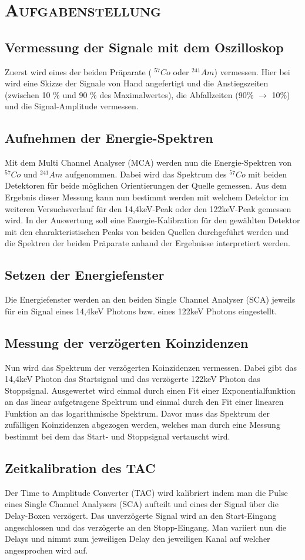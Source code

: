 \section{\textsc{Aufgabenstellung}}

\subsection*{Vermessung der Signale mit dem Oszilloskop}
Zuerst wird eines der beiden Präparate ( $^{57}Co$ oder $^{241}Am$) vermessen. Hier bei wird eine Skizze der Signale von Hand angefertigt und die Anstiegszeiten (zwischen 10 \% und 90 \% des Maximalwertes), die Abfallzeiten (90\% $\rightarrow$ 10\%) und die Signal-Amplitude vermessen.
\subsection*{Aufnehmen der Energie-Spektren}
Mit dem Multi Channel Analyser (MCA) werden nun die Energie-Spektren von $^{57}Co$ und $^{241}Am$ aufgenommen. Dabei wird das Spektrum des $^{57}Co$ mit beiden Detektoren für beide möglichen Orientierungen der Quelle gemessen. Aus dem Ergebnis dieser Messung kann nun bestimmt werden mit welchem Detektor im weiteren Versuchsverlauf für den 14,4keV-Peak oder den 122keV-Peak gemessen wird.
In der Auswertung soll eine Energie-Kalibration für den gewählten Detektor mit den charakteristischen Peaks von beiden Quellen durchgeführt werden und die Spektren der beiden Präparate anhand der Ergebnisse interpretiert werden.
\subsection*{Setzen der Energiefenster}
Die Energiefenster werden an den beiden Single Channel Analyser (SCA) jeweils für ein Signal eines 14,4keV Photons bzw. eines 122keV Photons eingestellt.
\subsection*{Messung der verzögerten Koinzidenzen}
Nun wird das Spektrum der verzögerten Koinzidenzen vermessen. Dabei gibt das 14,4keV Photon das Startsignal und das verzögerte 122keV Photon das Stoppsignal.
Ausgewertet wird einmal durch einen Fit einer Exponentialfunktion an das linear aufgetragene Spektrum und einmal durch den Fit einer linearen Funktion an das logarithmische Spektrum. Davor muss das Spektrum der zufälligen Koinzidenzen abgezogen werden, welches man durch eine Messung bestimmt bei dem das Start- und Stoppsignal vertauscht wird.
\subsection*{Zeitkalibration des TAC}
Der Time to Amplitude Converter (TAC) wird kalibriert indem man die Pulse eines Single Channel Analysers (SCA) aufteilt und eines der Signal über die Delay-Boxen verzögert. Das unverzögerte Signal wird an den Start-Eingang angeschlossen und das verzögerte an den Stopp-Eingang. Man variiert nun die Delays und nimmt zum jeweiligen Delay den jeweiligen Kanal auf welcher angesprochen wird auf.